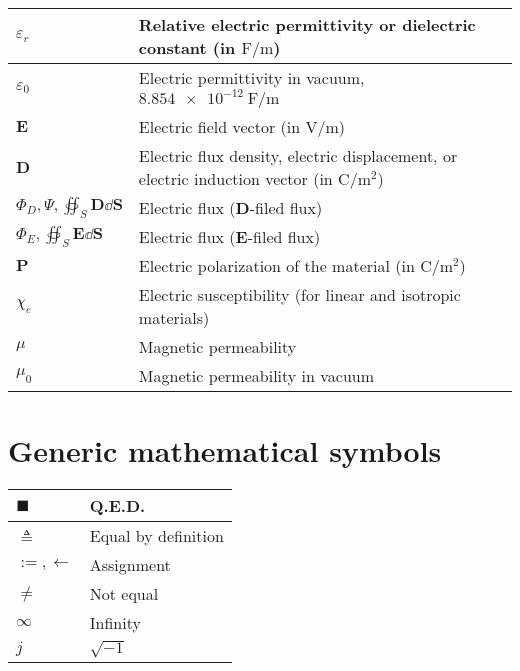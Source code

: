 \documentclass{article}
\begin{document}
\begin{xltabular}{\textwidth}{XX}
    \(\varepsilon_r\) & Relative electric permittivity or dielectric constant (in \(\si{\farad\per\meter}\)) \cite{ramoFieldsWavesCommunication1994} \\ \hline
    \(\varepsilon_0\) & Electric permittivity in vacuum, \(\SI{8.854e-12}{\farad\per\meter}\) \cite{ramoFieldsWavesCommunication1994} \\ \hline
    \(\mathbf{E}\) & Electric field vector (in \(\si{\volt\per\meter}\))\\ \hline
    \(\mathbf{D}\) & Electric flux density, electric displacement, or electric induction vector (in \(\si{\coulomb\per\meter\squared}\))\\ \hline
    \(\Phi_D, \varPsi, \oiint_S \mathbf{D} \dd{\mathbf{S}}\) & Electric flux (\(\mathbf{D}\)-filed flux) \cite{wiki:D-field-flux} \\ \hline
    \(\Phi_E, \oiint_S \mathbf{E} \dd{\mathbf{S}}\) & Electric flux (\(\mathbf{E}\)-filed flux) \cite{wiki:electric-flux} \\ \hline
    \(\mathbf{P}\) & Electric polarization of the material (in \(\si{\coulomb\per\meter\squared}\))\\ \hline
    \(\chi_e\) & Electric susceptibility (for linear and isotropic materials)\\ \hline
    \(\mu\) & Magnetic permeability \\ \hline
    \(\mu_0\) & Magnetic permeability in vacuum \\
\end{xltabular}

\section{Generic mathematical symbols}
\begin{xltabular}{\textwidth}{XX}
    \(\blacksquare\) & Q.E.D. \\ \hline
    \(\triangleq\) & Equal by definition\\ \hline
    \(:=, \leftarrow\) & Assignment \cite{rosenDiscreteMathematicsIts2011}\\ \hline
    \(\neq\) & Not equal\\ \hline
    \(\infty\) & Infinity\\ \hline
    \(j\) & \(\sqrt{-1}\)\\
\end{xltabular}
\end{document}
